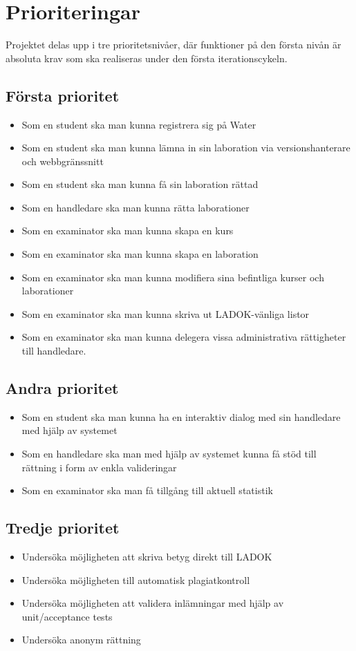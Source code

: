 \section{Prioriteringar}

Projektet delas upp i tre prioritetsnivåer, där funktioner på den första nivån är absoluta krav som ska realiseras under den första iterationscykeln.

\subsection{Första prioritet}

\begin{itemize}
\item Som en student ska man kunna registrera sig på Water
\item Som en student ska man kunna lämna in sin laboration via versionshanterare och webbgränssnitt
\item Som en student ska man kunna få sin laboration rättad
\item Som en handledare ska man kunna rätta laborationer
\item Som en examinator ska man kunna skapa en kurs
\item Som en examinator ska man kunna skapa en laboration
\item Som en examinator ska man kunna modifiera sina befintliga kurser och laborationer
\item Som en examinator ska man kunna skriva ut LADOK-vänliga listor
\item Som en examinator ska man kunna delegera vissa administrativa rättigheter till handledare.
\end{itemize}

\subsection{Andra prioritet}

\begin{itemize}
\item Som en student ska man kunna ha en interaktiv dialog med sin handledare med hjälp av systemet
\item Som en handledare ska man med hjälp av systemet kunna få stöd till rättning i form av enkla valideringar
\item Som en examinator ska man få tillgång till aktuell statistik
\end{itemize}

\subsection{Tredje prioritet}

\begin{itemize}
\item Undersöka möjligheten att skriva betyg direkt till LADOK
\item Undersöka möjligheten till automatisk plagiatkontroll
\item Undersöka möjligheten att validera inlämningar med hjälp av unit/acceptance tests
\item Undersöka anonym rättning
\end{itemize}
